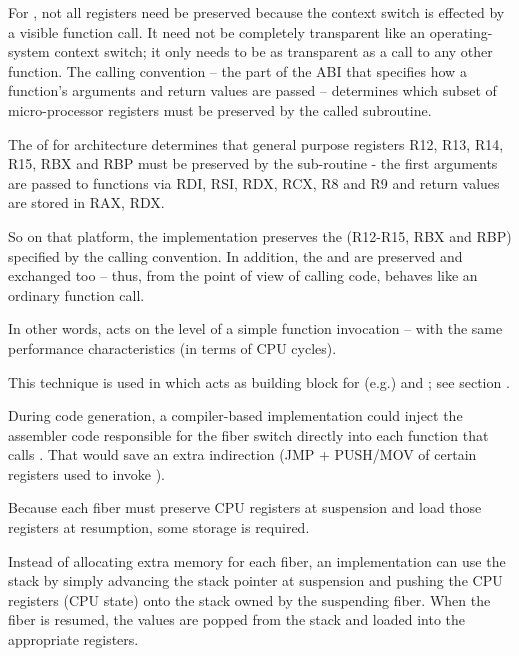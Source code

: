 \label{callingconvention}
For \fiber, not all registers need be preserved because the context
switch is effected by a visible function call. It need not be completely transparent like
an operating-system context switch; it only needs to be as transparent as a call
to any other function. The calling convention -- the part of the ABI that
specifies how a function's arguments and return values are passed -- determines
which subset of micro-processor registers must be preserved by the called
subroutine.

The \cite{SYSVABI} of  for 
architecture determines that general purpose registers R12, R13, R14, R15, RBX
and RBP must be preserved by the sub-routine - the first arguments are passed
to functions via RDI, RSI, RDX, RCX, R8 and R9 and return values are stored in
RAX, RDX.

So on that platform, the \resume implementation preserves the  (R12-R15, RBX and RBP) specified by the calling convention.
In addition, the  and  are
preserved and exchanged too -- thus, from the point of view of calling
code, \resume behaves like an ordinary function call.

In other words, \resume acts on the level of a simple function invocation --
with the same performance characteristics (in terms of CPU cycles).

This technique is used in \bcontext\cite{bcontext} which acts as building block
for (e.g.) \fbfibers\xspace and \bbquantum; see section .

 During code generation,
a compiler-based implementation could inject the assembler code responsible
for the fiber switch directly into each function that calls \resume. That would save
an extra indirection (JMP + PUSH/MOV of certain registers used to
invoke \resume).

 Because each fiber must preserve CPU
registers at suspension and load those registers at resumption, some storage
is required.

Instead of allocating extra memory for each fiber, an implementation can use
the stack by simply advancing the stack pointer at suspension and pushing the
CPU registers (CPU state) onto the stack owned by the suspending fiber. When
the fiber is resumed, the values are popped from the stack and loaded into the
appropriate registers.

